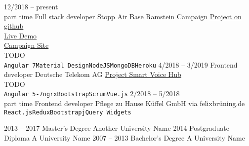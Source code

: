 \documentclass[9pt]{developercv} %
\begin{document}
\begin{entrylist}
	\entry
		{12/2018 -- present\\\footnotesize{part time}}
		{Full stack developer}
		{Stopp Air Base Ramstein Campaign}
    {
      \href{https://github.com/frot-io/ramstein-conference-app}{Project on github}\\
      \href{https://ramstein-conference-app.herokuapp.com/}{Live Demo}\\
      \href{https://www.ramstein-kampagne.eu/}{Campaign Site}\\
      TODO\\ 
      \texttt{Angular 7}\slashsep\texttt{Material Design}\slashsep\texttt{NodeJS}\slashsep\texttt{MongoDB}\slashsep\texttt{Heroku}
    }
  \entry
		{4/2018 -- 3/2019}
		{Frontend developer}
		{Deutsche Telekom AG}
    {
      \href{https://www.telekom.de/zuhause/geraete-und-zubehoer/smart-speaker}{Project Smart Voice Hub}\\
      TODO\\
      \texttt{Angular 5-7}\slashsep\texttt{ngrx}\slashsep\texttt{Bootstrap}\slashsep\texttt{Scrum}\slashsep\texttt{Vue.js}
    }
	\entry
		{2/2018 -- 5/2018\\\footnotesize{part time}}
		{Frontend developer}
		{Pflege zu Hause Küffel GmbH}
		{
      via felixbrüning.de\\
      \texttt{React.js}\slashsep\texttt{Redux}\slashsep\texttt{Bootstrap}\slashsep\texttt{jQuery Widgets}
    }
\end{entrylist}



\begin{entrylist}
	\entry
		{2013 -- 2017}
		{Master's Degree}
		{Another University Name}
		{\lorem\lorem\lorem}
	\entry
		{2014}
		{Postgraduate Diploma}
		{A University Name}
		{\lorem\lorem}
	\entry
		{2007 -- 2013}
		{Bachelor's Degree}
		{A University Name}
		{\lorem\lorem}
\end{entrylist}

\end{document}
